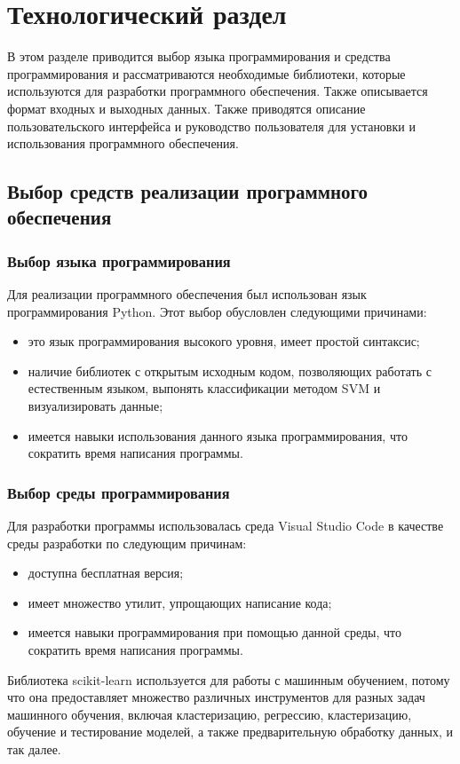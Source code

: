 \chapter{Технологический раздел}
В этом разделе приводится выбор языка программирования и средства программирования и рассматриваются необходимые библиотеки, которые используются для разработки программного обеспечения. Также описывается формат входных и выходных данных. Также приводятся описание пользовательского интерфейса и руководство пользователя для установки и использования программного обеспечения.
\section{Выбор средств реализации программного обеспечения}
\subsection{Выбор языка программирования}
Для реализации программного обеспечения был использован язык программирования Python\cite{python}. Этот выбор обусловлен следующими причинами:
\begin{itemize}[label = ---]
    \item это язык программирования высокого уровня, имеет простой синтаксис;
    \item наличие библиотек с открытым исходным кодом, позволяющих работать с естественным языком, выпонять классификации методом SVM и визуализировать данные;
    \item имеется навыки использования данного языка программирования, что сократить время написания программы.
\end{itemize}

\subsection{Выбор среды программирования}
Для разработки программы использовалась среда Visual Studio Code \cite{vscode} в качестве среды разработки по следующим причинам:
\begin{itemize}[label = ---]
    \item доступна бесплатная версия;
    \item имеет множество утилит, упрощающих написание кода;
    \item имеется навыки программирования при помощью данной среды, что сократить время написания программы.
\end{itemize}

Библиотека scikit-learn используется для работы с машинным обучением, потому что она предоставляет множество различных инструментов для разных задач машинного обучения, включая кластеризацию, регрессию, кластеризацию, обучение и тестирование моделей, а также предварительную обработку данных, и так далее. 

